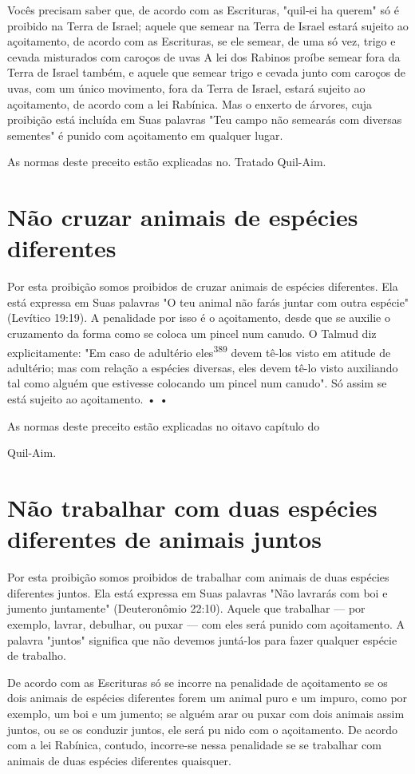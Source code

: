 \begin{itemize}
\begin{enumrate}
\begin{itemize}
\begin{itemize}
\begin{itemize}
Vocês precisam saber que, de acordo com as Escrituras, "quil-ei ha
querem" só é proibido na Terra de Israel; aquele que semear na Terra de
Israel estará sujeito ao açoitamento, de acordo com as Escrituras, se
ele semear, de uma só vez, trigo e cevada misturados com caroços de uvas
A lei dos Rabinos proíbe semear fora da Terra de Israel também, e aquele
que semear trigo e ce­vada junto com caroços de uvas, com um único
movimento, fora da Terra de Israel, estará sujeito ao açoitamento, de
acordo com a lei Rabínica. Mas o en­xerto de árvores, cuja proibição
está incluída em Suas palavras "Teu campo não semearás com diversas
sementes" é punido com açoitamento em qualquer lugar.


As normas deste preceito estão explicadas no. Tratado Quil-Aim.


\section{Não cruzar animais de espécies diferentes}

Por esta proibição somos proibidos de cruzar animais de espécies
diferentes. Ela está expressa em Suas palavras "O teu animal não farás
juntar com outra espécie" (Levítico 19:19). A penalidade por isso é o
açoitamento, desde que se auxilie o cruzamento da forma como se coloca
um pincel num canudo. O Talmud diz explicitamente: "Em caso de adultério
eles\textsuperscript{389} devem tê-los visto em atitude de adultério;
mas com relação a espécies diversas, eles devem tê-lo visto auxiliando
tal como alguém que estivesse colocando um pin­cel num canudo". Só assim
se está sujeito ao açoitamento. • •


As normas deste preceito estão explicadas no oitavo capítulo do


Quil-Aim.

\section{Não trabalhar com duas espécies diferentes de animais juntos}

Por esta proibição somos proibidos de trabalhar com animais de duas
espécies diferentes juntos. Ela está expressa em Suas palavras "Não
lavrarás com boi e jumento juntamente" (Deuteronômio 22:10). 
Aquele que trabalhar ---
por exemplo, lavrar, debulhar, ou puxar --- com eles será punido com
açoitamen­to. A palavra "juntos" significa que não devemos juntá-los
para fazer qualquer espécie de trabalho.

De acordo com as Escrituras só se incorre na penalidade de açoi­tamento
se os dois animais de espécies diferentes forem um animal puro e um
impuro, como por exemplo, um boi e um jumento; se alguém arar ou puxar
com dois animais assim juntos, ou se os conduzir juntos, ele será pu
nido com o açoitamento. De acordo com a lei Rabínica, contudo,
incorre-se nessa penalidade se se trabalhar com animais de duas espécies
diferentes quaisquer.



\end{itemize}
\end{itemize}
\end{itemize}
\end{enumrate}
\end{itemize}
